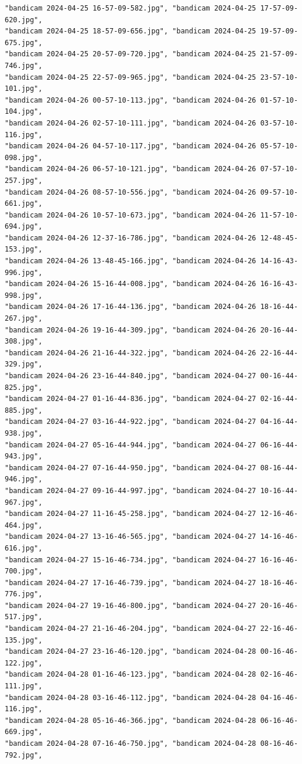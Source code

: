 \documentclass[11pt]{article}
\begin{document}
\begin{verbatim}
"bandicam 2024-04-25 16-57-09-582.jpg", "bandicam 2024-04-25 17-57-09-620.jpg",
"bandicam 2024-04-25 18-57-09-656.jpg", "bandicam 2024-04-25 19-57-09-675.jpg",
"bandicam 2024-04-25 20-57-09-720.jpg", "bandicam 2024-04-25 21-57-09-746.jpg",
"bandicam 2024-04-25 22-57-09-965.jpg", "bandicam 2024-04-25 23-57-10-101.jpg",
"bandicam 2024-04-26 00-57-10-113.jpg", "bandicam 2024-04-26 01-57-10-104.jpg",
"bandicam 2024-04-26 02-57-10-111.jpg", "bandicam 2024-04-26 03-57-10-116.jpg",
"bandicam 2024-04-26 04-57-10-117.jpg", "bandicam 2024-04-26 05-57-10-098.jpg",
"bandicam 2024-04-26 06-57-10-121.jpg", "bandicam 2024-04-26 07-57-10-257.jpg",
"bandicam 2024-04-26 08-57-10-556.jpg", "bandicam 2024-04-26 09-57-10-661.jpg",
"bandicam 2024-04-26 10-57-10-673.jpg", "bandicam 2024-04-26 11-57-10-694.jpg",
"bandicam 2024-04-26 12-37-16-786.jpg", "bandicam 2024-04-26 12-48-45-153.jpg",
"bandicam 2024-04-26 13-48-45-166.jpg", "bandicam 2024-04-26 14-16-43-996.jpg",
"bandicam 2024-04-26 15-16-44-008.jpg", "bandicam 2024-04-26 16-16-43-998.jpg",
"bandicam 2024-04-26 17-16-44-136.jpg", "bandicam 2024-04-26 18-16-44-267.jpg",
"bandicam 2024-04-26 19-16-44-309.jpg", "bandicam 2024-04-26 20-16-44-308.jpg",
"bandicam 2024-04-26 21-16-44-322.jpg", "bandicam 2024-04-26 22-16-44-329.jpg",
"bandicam 2024-04-26 23-16-44-840.jpg", "bandicam 2024-04-27 00-16-44-825.jpg",
"bandicam 2024-04-27 01-16-44-836.jpg", "bandicam 2024-04-27 02-16-44-885.jpg",
"bandicam 2024-04-27 03-16-44-922.jpg", "bandicam 2024-04-27 04-16-44-938.jpg",
"bandicam 2024-04-27 05-16-44-944.jpg", "bandicam 2024-04-27 06-16-44-943.jpg",
"bandicam 2024-04-27 07-16-44-950.jpg", "bandicam 2024-04-27 08-16-44-946.jpg",
"bandicam 2024-04-27 09-16-44-997.jpg", "bandicam 2024-04-27 10-16-44-967.jpg",
"bandicam 2024-04-27 11-16-45-258.jpg", "bandicam 2024-04-27 12-16-46-464.jpg",
"bandicam 2024-04-27 13-16-46-565.jpg", "bandicam 2024-04-27 14-16-46-616.jpg",
"bandicam 2024-04-27 15-16-46-734.jpg", "bandicam 2024-04-27 16-16-46-700.jpg",
"bandicam 2024-04-27 17-16-46-739.jpg", "bandicam 2024-04-27 18-16-46-776.jpg",
"bandicam 2024-04-27 19-16-46-800.jpg", "bandicam 2024-04-27 20-16-46-517.jpg",
"bandicam 2024-04-27 21-16-46-204.jpg", "bandicam 2024-04-27 22-16-46-135.jpg",
"bandicam 2024-04-27 23-16-46-120.jpg", "bandicam 2024-04-28 00-16-46-122.jpg",
"bandicam 2024-04-28 01-16-46-123.jpg", "bandicam 2024-04-28 02-16-46-111.jpg",
"bandicam 2024-04-28 03-16-46-112.jpg", "bandicam 2024-04-28 04-16-46-116.jpg",
"bandicam 2024-04-28 05-16-46-366.jpg", "bandicam 2024-04-28 06-16-46-669.jpg",
"bandicam 2024-04-28 07-16-46-750.jpg", "bandicam 2024-04-28 08-16-46-792.jpg",

\end{verbatim}
\end{document}
